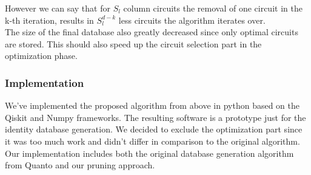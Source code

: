However we can say that for $S_l$ column circuits the removal of one circuit in the k-th iteration, results in $S_l^{d-k}$ less circuits the algorithm iterates over.\\

The size of the final database also greatly decreased since only optimal circuits are stored. This should also speed up the circuit selection part in the optimization phase.

\subsubsection{Implementation}
We've implemented the proposed algorithm from above in python based on the Qiskit and Numpy frameworks. The resulting software is a prototype just for the identity database generation. We decided to exclude the optimization part since it was too much work and didn't differ in comparison to the original algorithm. Our implementation includes both the original database generation algorithm from Quanto and our pruning approach.






